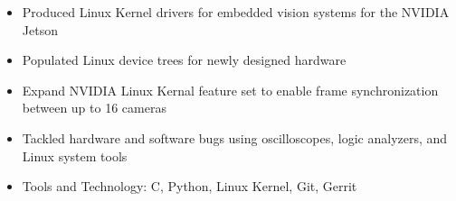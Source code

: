 \begin{itemize}
    \setlength\itemsep{0pt}
    \setlength{\parskip}{0pt}
    \item Produced Linux Kernel drivers for embedded vision systems for the NVIDIA Jetson
    \item Populated Linux device trees for newly designed hardware
    \item Expand NVIDIA Linux Kernal feature set to enable frame synchronization between up to 16 cameras
    \item Tackled hardware and software bugs using oscilloscopes, logic analyzers, and Linux system tools
    \item Tools and Technology: C, Python, Linux Kernel, Git, Gerrit
\end{itemize}
